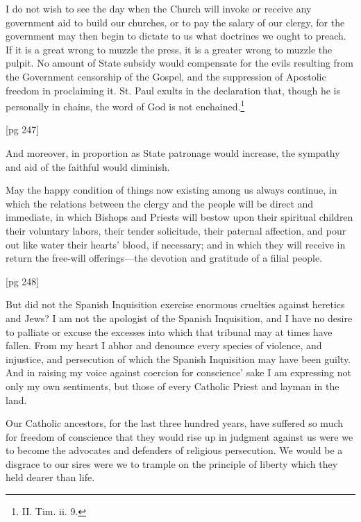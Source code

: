 I do not wish to see the day when the Church
will invoke or receive any government aid to build
our churches, or to pay the salary of our clergy,
for the government may then begin to dictate to
us what doctrines we ought to preach. If it is a
great wrong to muzzle the press, it is a greater
wrong to muzzle the pulpit. No amount of State
subsidy would compensate for the evils resulting
from the Government censorship of the Gospel, and
the suppression of Apostolic freedom in proclaiming
it. St. Paul exults in the declaration that,
though he is personally in chains, the word of God
is not enchained.\footnote{II. Tim. ii. 9.}

[pg 247]

And moreover, in proportion as State patronage
would increase, the sympathy and aid of the faithful
would diminish.

May the happy condition of things now existing
among us always continue, in which the relations
between the clergy and the people will be
direct and immediate, in which Bishops and
Priests will bestow upon their spiritual children
their voluntary labors, their tender solicitude,
their paternal affection, and pour out like water
their hearts' blood, if necessary; and in which
they will receive in return the free-will offerings—the
devotion and gratitude of a filial people.

[pg 248]



But did not the Spanish Inquisition exercise
enormous cruelties against heretics and
Jews? I am not the apologist of the Spanish
Inquisition, and I have no desire to palliate
or excuse the excesses into which that tribunal
may at times have fallen. From my heart I abhor
and denounce every species of violence, and
injustice, and persecution of which the Spanish
Inquisition may have been guilty. And in raising
my voice against coercion for conscience' sake I
am expressing not only my own sentiments, but
those of every Catholic Priest and layman in
the land.

Our Catholic ancestors, for the last three hundred
years, have suffered so much for freedom
of conscience that they would rise up in judgment
against us were we to become the advocates and
defenders of religious persecution. We would be
a disgrace to our sires were we to trample on
the principle of liberty which they held dearer
than life.

